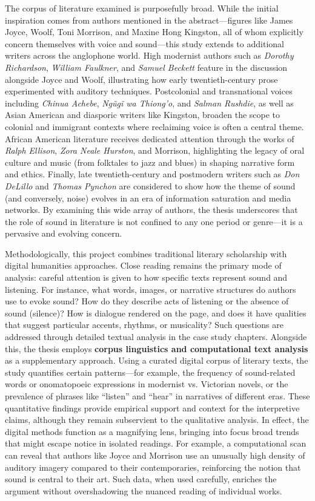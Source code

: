 \documentclass[12pt]{report}
\begin{document}
The corpus of literature examined is purposefully broad. While the initial inspiration comes from authors mentioned in the abstract—figures like James Joyce, Woolf, Toni Morrison, and Maxine Hong Kingston, all of whom explicitly concern themselves with voice and sound—this study extends to additional writers across the anglophone world. High modernist authors such as \textit{Dorothy Richardson}, \textit{William Faulkner}, and \textit{Samuel Beckett} feature in the discussion alongside Joyce and Woolf, illustrating how early twentieth-century prose experimented with auditory techniques. Postcolonial and transnational voices including \textit{Chinua Achebe}, \textit{Ngũgĩ wa Thiong’o}, and \textit{Salman Rushdie}, as well as Asian American and diasporic writers like Kingston, broaden the scope to colonial and immigrant contexts where reclaiming voice is often a central theme. African American literature receives dedicated attention through the works of \textit{Ralph Ellison}, \textit{Zora Neale Hurston}, and Morrison, highlighting the legacy of oral culture and music (from folktales to jazz and blues) in shaping narrative form and ethics. Finally, late twentieth-century and postmodern writers such as \textit{Don DeLillo} and \textit{Thomas Pynchon} are considered to show how the theme of sound (and conversely, noise) evolves in an era of information saturation and media networks. By examining this wide array of authors, the thesis underscores that the role of sound in literature is not confined to any one period or genre—it is a pervasive and evolving concern.

Methodologically, this project combines traditional literary scholarship with digital humanities approaches. Close reading remains the primary mode of analysis: careful attention is given to how specific texts represent sound and listening. For instance, what words, images, or narrative structures do authors use to evoke sound? How do they describe acts of listening or the absence of sound (silence)? How is dialogue rendered on the page, and does it have qualities that suggest particular accents, rhythms, or musicality? Such questions are addressed through detailed textual analysis in the case study chapters. Alongside this, the thesis employs \textbf{corpus linguistics and computational text analysis} as a supplementary approach. Using a curated digital corpus of literary texts, the study quantifies certain patterns—for example, the frequency of sound-related words or onomatopoeic expressions in modernist vs. Victorian novels, or the prevalence of phrases like “listen” and “hear” in narratives of different eras. These quantitative findings provide empirical support and context for the interpretive claims, although they remain subservient to the qualitative analysis. In effect, the digital methods function as a magnifying lens, bringing into focus broad trends that might escape notice in isolated readings. For example, a computational scan can reveal that authors like Joyce and Morrison use an unusually high density of auditory imagery compared to their contemporaries, reinforcing the notion that sound is central to their art. Such data, when used carefully, enriches the argument without overshadowing the nuanced reading of individual works.
\end{document}
